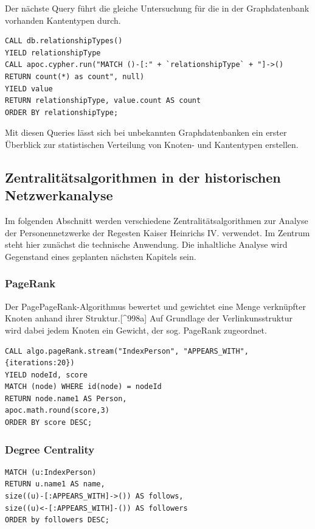 \documentclass[12pt,ngerman,]{article}
\begin{document}
Der nächste Query führt die gleiche Untersuchung für die in der
Graphdatenbank vorhanden Kantentypen durch.

\begin{verbatim}
CALL db.relationshipTypes()
YIELD relationshipType
CALL apoc.cypher.run("MATCH ()-[:" + `relationshipType` + "]->()
RETURN count(*) as count", null)
YIELD value
RETURN relationshipType, value.count AS count
ORDER BY relationshipType;
\end{verbatim}

Mit diesen Queries lässt sich bei unbekannten Graphdatenbanken ein
erster Überblick zur statistischen Verteilung von Knoten- und
Kantentypen erstellen.

\subsection{Zentralitätsalgorithmen in der historischen
Netzwerkanalyse}\label{zentralituxe4tsalgorithmen-in-der-historischen-netzwerkanalyse}

Im folgenden Abschnitt werden verschiedene Zentralitätsalgorithmen zur
Analyse der Personennetzwerke der Regesten Kaiser Heinrichs IV.
verwendet. Im Zentrum steht hier zunächst die technische Anwendung. Die
inhaltliche Analyse wird Gegenstand eines geplanten nächsten Kapitels
sein.

\subsubsection{PageRank}\label{pagerank}

Der PagePageRank-Algorithmus bewertet und gewichtet eine Menge
verknüpfter Knoten anhand ihrer Struktur.{[}\^{}998a{]} Auf Grundlage
der Verlinkunsstruktur wird dabei jedem Knoten ein Gewicht, der sog.
PageRank zugeordnet.

\begin{verbatim}
CALL algo.pageRank.stream("IndexPerson", "APPEARS_WITH",
{iterations:20})
YIELD nodeId, score
MATCH (node) WHERE id(node) = nodeId
RETURN node.name1 AS Person,
apoc.math.round(score,3)
ORDER BY score DESC;
\end{verbatim}

\subsubsection{Degree Centrality}\label{degree-centrality}

\begin{verbatim}
MATCH (u:IndexPerson)
RETURN u.name1 AS name,
size((u)-[:APPEARS_WITH]->()) AS follows,
size((u)<-[:APPEARS_WITH]-()) AS followers
ORDER by followers DESC;
\end{verbatim}
\end{document}
